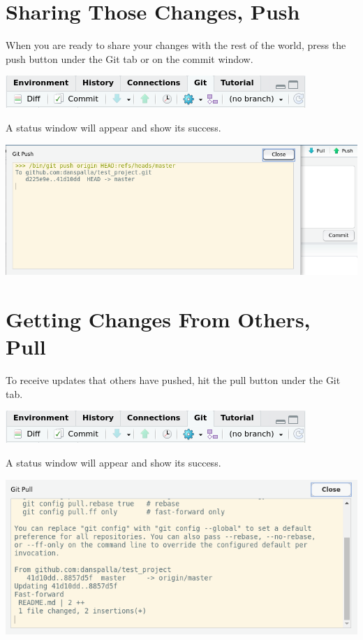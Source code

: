 \documentclass[
]{book}
\begin{document}
\hypertarget{sharing-those-changes-push}{%
\section{Sharing Those Changes, Push}\label{sharing-those-changes-push}}

When you are ready to share your changes with the rest of the world, press the push button under the Git tab or on the commit window.

\includegraphics{images/02-commit_1.png}

A status window will appear and show its success.

\includegraphics{images/02-push_1.png}

\hypertarget{getting-changes-from-others-pull}{%
\section{Getting Changes From Others, Pull}\label{getting-changes-from-others-pull}}

To receive updates that others have pushed, hit the pull button under the Git tab.

\includegraphics{images/02-commit_1.png}

A status window will appear and show its success.

\includegraphics{images/02-pull_1.png}
\end{document}

